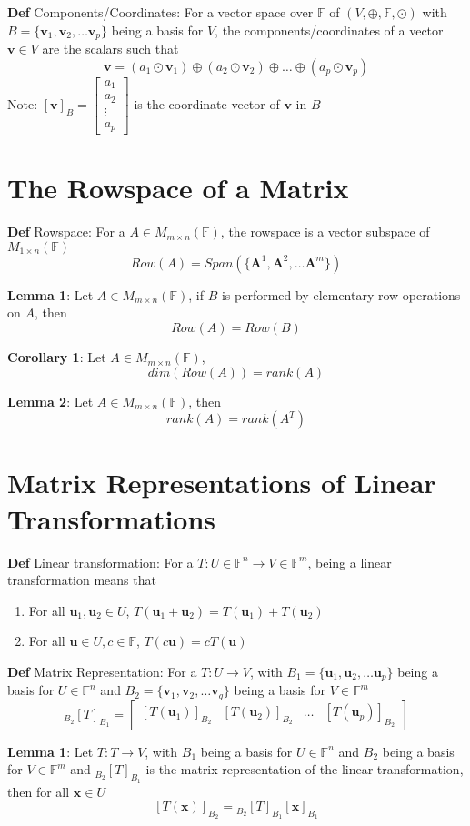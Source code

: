 \documentclass[11pt,notitlepage]{report}
\newcommand{\bb}[1]{\ensuremath{\mathbb{#1}}}
\newcommand{\tbf}[1]{\textbf{#1}}
\begin{document}
\textbf{Def} Components/Coordinates: For a vector space over $\bb F$ of $(V, \oplus, \bb F, \odot)$ with $B = \{\tbf v_1, \tbf v_2, \dots \tbf v_p\}$ being a basis for $V$, the components/coordinates of a vector $\tbf v \in V$ are the scalars such that
$$\tbf v = (a_1 \odot \tbf v_1) \oplus (a_2 \odot \tbf v_2) \oplus \dots \oplus (a_p \odot \tbf v_p)$$
\hspace*{5mm} Note: $[\tbf v]_B = \begin{bmatrix}
a_1\\a_2\\ \vdots \\ a_p
\end{bmatrix}$ is the coordinate vector of $\tbf v$ in $B$

\newpage
\section{The Rowspace of a Matrix}

\textbf{Def} Rowspace: For a $A \in M_{m \times n}(\bb F)$, the rowspace is a vector subspace of $M_{1 \times n}(\bb F)$
$$Row(A) = Span(\{\tbf A^1, \tbf A^2, \dots \tbf A^m\})$$

\textbf{Lemma 1}: Let $A \in M_{m \times n}(\bb F)$, if $B$ is performed by elementary row operations on $A$, then
$$Row(A) = Row(B)$$

\textbf{Corollary 1}: Let $A \in M_{m \times n}(\bb F)$,
$$dim(Row(A)) = rank(A)$$

\textbf{Lemma 2}: Let $A \in M_{m \times n}(\bb F)$, then
$$rank(A) = rank(A^T)$$

\section{Matrix Representations of Linear Transformations}

\textbf{Def} Linear transformation: For a $T: U \in \bb F^n \to V \in \bb F^m$, being a linear transformation means that
\begin{enumerate}
    \item For all $\tbf u_1, \tbf u_2 \in U$, $T(\tbf u_1 + \tbf u_2) = T(\tbf u_1) + T(\tbf u_2)$
    \item For all $\tbf u \in U, c \in \bb F$, $T(c\tbf u) = cT(\tbf u)$
\end{enumerate}

\textbf{Def} Matrix Representation: For a $T: U \to V$, with $B_1 = \{\tbf u_1, \tbf u_2, \dots \tbf u_p\}$ being a basis for $U \in \bb F^n$ and $B_2 = \{\tbf v_1, \tbf v_2, \dots \tbf v_q\}$ being a basis for $V \in \bb F^m$
$${}_{B_2}[T]_{B_1} = \begin{bmatrix}[T(\tbf u_1)]_{B_2} & [T(\tbf u_2)]_{B_2} & \dots & [T(\tbf u_p)]_{B_2}\end{bmatrix}$$

\textbf{Lemma 1}: Let $T: T \to V$, with $B_1$ being a basis for $U \in \bb F^n$ and $B_2$ being a basis for $V \in \bb F^m$ and ${}_{B_2}[T]_{B_1}$ is the matrix representation of the linear transformation, then for all $\tbf x \in U$
$$[T(\tbf x)]_{B_2} = {}_{B_2}[T]_{B_1} [\tbf x]_{B_1}$$
\end{document}
